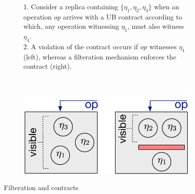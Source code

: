 \begin{figure}
\centering
\vspace{-1mm}
	\begin{subfigure}[b]{0.65 \textwidth}
	\begin{scriptsize}
	1. Consider a replica containing $\{\eta_1,\eta_2,\eta_3\}$ when an
	operation $op$ arrives with a \textsf{UB} contract according to
	which, any operation
	witnessing $\eta_1$, must also witness $\eta_4$.
	\\2. A violation of the contract occurs if $op$
	witnesses $\eta_1$ (left), whereas a 
	filteration mechanism enforces the contract
	(right).
	\end{scriptsize}
	\end{subfigure}
	~
	\begin{subfigure}[b]{0.298 \textwidth}
	\includegraphics[scale=0.36]{Figures/ub.pdf}
	\end{subfigure}
	\caption{Filteration and \UB{} contracts}
\vspace{-5mm}
\label{fig:ub}
\end{figure}
